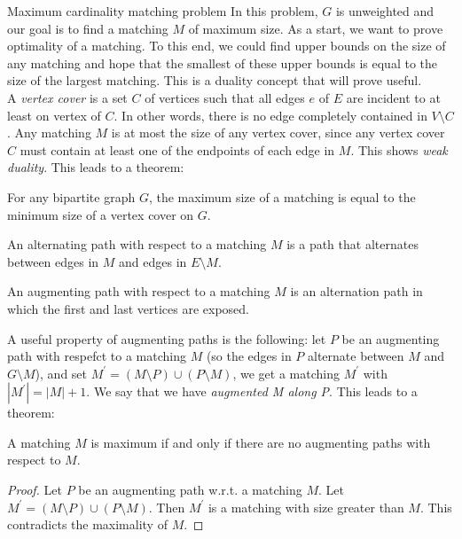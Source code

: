\documentclass[11pt]{article}
\newenvironment{theorem}[2][Theorem]{\begin{trivlist}
\item[\hskip \labelsep {\bfseries #1}\hskip \labelsep {\bfseries #2.}]}{\end{trivlist}}
\newenvironment{definition}[2][Definition]{\begin{trivlist}
\item[\hskip \labelsep {\bfseries #1}\hskip \labelsep {\bfseries #2.}]}{\end{trivlist}}
\begin{document}
\begin{section}{Maximum cardinality matching problem}
	In this problem, $G$ is unweighted and our goal is to find a matching $M$ of maximum size.
	As a start, we want to prove optimality of a matching. To this end, we could find upper 
	bounds on the size of any matching and hope that the smallest of these upper bounds  is 
	equal to the size of the largest matching. This is a duality concept that will prove 
	useful. \\
	A \emph{vertex cover} is a set $C$ of vertices such that all edges $e$ of $E$ are incident to 
	at least on vertex of $C$. In other words, there is no edge completely contained in 
	$V\setminus C$. Any matching $M$ is at most the size of any vertex cover, since any 
	vertex cover $C$ must contain at least one of the endpoints of each edge in $M$. This 
	shows \emph{weak duality}. This leads to a theorem:

	\begin{theorem}{}
		For any bipartite graph $G$, the maximum size of a matching is equal to the minimum size 
		of a vertex cover on $G$.
	\end{theorem}

	\begin{definition}{(Alternating path)}
		An alternating path with respect to a matching $M$ is a path that alternates between 
		edges in $M$ and edges in $E\setminus M$.
	\end{definition}

	\begin{definition}{(Augmenting path)}
		An augmenting path with respect to a matching $M$ is an alternation path in which the 
		first and last vertices are exposed.
	\end{definition}

	A useful property of augmenting paths is the following: let $P$ be an augmenting path with 
	respefct to a matching $M$ (so the edges in $P$ alternate between $M$ and $G\setminus M$), 
	and set $M^{'} = (M\setminus P)\cup (P\setminus M)$, we get a matching $M^{'}$ with 
	$|M^{'}| = |M| + 1$. We say that we have \emph{augmented M along P}. This leads to a theorem:

	\begin{theorem}{}
		A matching $M$ is maximum if and only if there are no augmenting paths with 
		respect to $M$.
	\end{theorem}

	\begin{proof}{}
		Let $P$ be an augmenting path w.r.t. a matching $M$. Let $M^{'} = (M\setminus P)\cup 
		(P\setminus M)$. Then $M^{'}$ is a matching with size greater than $M$. This 
		contradicts the maximality of $M$.


\end{proof}
\end{section}
\end{document}
